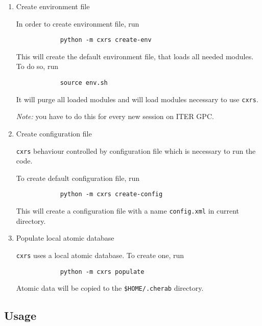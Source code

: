 \documentclass[../main.tex]{subfiles}
\begin{document}
\begin{enumerate}[label = Step \arabic*:, align = left]

    \item Create environment file

          In order to create environment file, run

          \begin{verbatim}
            python -m cxrs create-env
          \end{verbatim}

          This will create the default environment file, that loads all needed modules. To do so, run

          \begin{verbatim}
            source env.sh
          \end{verbatim}

          It will purge all loaded modules and will load modules necessary to use \texttt{cxrs}.

          \emph{Note:} you have to do this for every new session on ITER GPC.


    \item {Create configuration file}

          \texttt{cxrs} behaviour controlled by configuration file which is necessary to run the code.

          To create default configuration file, run

          \begin{verbatim}
            python -m cxrs create-config
          \end{verbatim}

          This will create a configuration file with a name \texttt{config.xml} in current directory.


    \item {Populate local atomic database}

          \texttt{cxrs} uses a local atomic database. To create one, run

          \begin{verbatim}
            python -m cxrs populate
          \end{verbatim}

          Atomic data will be copied to the \texttt{\$HOME/.cherab} directory.

\end{enumerate}

\subsection{Usage}
\end{document}
